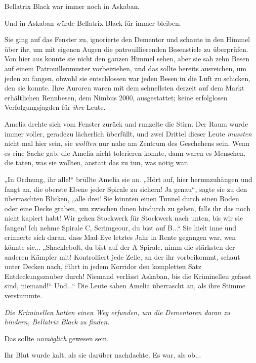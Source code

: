 {Bellatrix Black war immer noch in Askaban.

Und in Askaban würde Bellatrix Black für immer bleiben.

Sie ging auf das Fenster zu, ignorierte den Dementor und schaute in den Himmel über ihr, um mit eigenen Augen die patrouillierenden Besenstiele zu überprüfen. Von hier aus konnte sie nicht den ganzen Himmel sehen, aber sie sah zehn Besen auf einem Patrouillenmuster vorbeiziehen, und das sollte bereits ausreichen, um jeden zu fangen, obwohl sie entschlossen war jeden Besen in die Luft zu schicken, den sie konnte. Ihre Auroren waren mit dem schnellsten derzeit auf dem Markt erhältlichen Rennbesen, dem Nimbus 2000, ausgestattet; keine erfolglosen Verfolgungsjagden für \emph{ihre} Leute.

Amelia drehte sich vom Fenster zurück und runzelte die Stirn. Der Raum wurde immer voller, geradezu lächerlich überfüllt, und zwei Drittel dieser Leute \emph{mussten} nicht mal hier sein, sie \emph{wollten} nur nahe am Zentrum des Geschehens sein. Wenn es eine Sache gab, die Amelia nicht tolerieren konnte, dann waren es Menschen, die taten, was sie wollten, anstatt das zu tun, was nötig war.

„In Ordnung, ihr alle!“ brüllte Amelia sie an. „Hört auf, hier herumzuhängen und fangt an, die oberste Ebene jeder Spirale zu sichern! Ja genau“, sagte sie zu den überraschten Blicken, „alle drei! Sie könnten einen Tunnel durch einen Boden oder eine Decke graben, um zwischen ihnen hindurch zu gehen, falls ihr das noch nicht kapiert habt! Wir gehen Stockwerk für Stockwerk nach unten, bis wir sie fangen! Ich nehme Spirale C, Scrimgeour, du bist auf B...“ Sie hielt inne und erinnerte sich daran, dass Mad-Eye letztes Jahr in Rente gegangen war, wen könnte sie... „Shacklebolt, du bist auf der A-Spirale, nimm die stärksten der anderen Kämpfer mit! Kontrolliert jede Zelle, an der ihr vorbeikommt, schaut unter Decken nach, führt in jedem Korridor den kompletten Satz Entdeckungszauber durch! Niemand verlässt Askaban, bis die Kriminellen gefasst sind, niemand!“ Und...“ Die Leute sahen Amelia überrascht an, als ihre Stimme verstummte.

\emph{\emph{Die Kriminellen hatten einen Weg erfunden, um die Dementoren daran zu hindern, Bellatrix Black zu finden.}}

Das sollte \emph{unmöglich} gewesen sein.

Ihr Blut wurde kalt, als sie darüber nachdachte. Es war, als ob...

}
